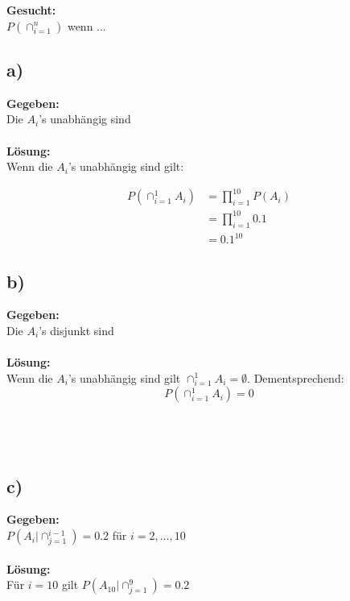 \documentclass{article}
\begin{document}
\textbf{Gesucht:} \\

$P(\cap_{i=1}^{n})$ wenn ...\\

\subsection*{a)}

\textbf{Gegeben:} \\

Die $A_{i}$'s unabhängig sind \\ \\
\textbf{Lösung:} \\

Wenn die $A_{i}$'s unabhängig sind gilt: 

\begin{align*}
    P(\cap_{i=1}^{1}A_{i}) &= \prod_{i =1}^{10} P(A_{i}) \\
    &= \prod_{i =1}^{10} 0.1 \\
    &= 0.1^{10}
\end{align*}

\subsection*{b)}

\textbf{Gegeben:} \\

Die $A_{i}$'s disjunkt sind \\ \\
\textbf{Lösung:} \\

Wenn die $A_{i}$'s unabhängig sind gilt  $\cap_{i=1}^{1}A_{i} = \emptyset$. Dementsprechend: \[P(\cap_{i=1}^{1}A_{i}) = 0\]
\\ \\ \\
\subsection*{c)}

\textbf{Gegeben:} \\

$P(A_{i}|\cap_{j=1}^{i-1}) = 0.2 $ für $i = 2, \ldots, 10$ \\ \\
\textbf{Lösung:} \\

Für $i = 10$ gilt $P(A_{10}| \cap_{j=1}^{9}) = 0.2$
\end{document}
